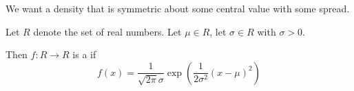 
\sbasic


















\sstart
{}


We want a density that is
symmetric about some central
value with some spread.


Let $R$ denote the set of real numbers.
Let $\mu \in R$, let $\sigma \in R$
with $\sigma > 0$.

Then $f: R \to R$ is a 
if
\[
  f(x) = \frac{1}{\sqrt{2\pi}\sigma}\exp\left(\frac{1}{2\sigma^2}(x - \mu)^2\right)
\]
\strats
